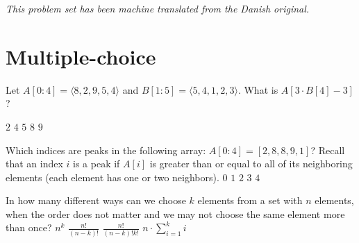 \noindent\emph{This problem set has been machine translated from the Danish original.}
\medskip

\section*{Multiple-choice}\label{sec:mc}


\multiplechoicestart



Let \(A[0:4] = \langle 8, 2, 9, 5, 4 \rangle\) and \(B[1:5] = \langle 5, 4, 1, 2, 3 \rangle\).
What is \(A[3 \cdot B[4]-3]\)?
\oneanswer

\optionsstart
\answer \(2\)
\answer \(4\)
\answer \(5\) \correct
\answer \(8\)
\answer \(9\)
\optionsend
{}

Which indices are peaks in the following array: \(A[0:4] = [2,8,8,9,1]\)?
Recall that an index \(i\) is a peak if \(A[i]\) is greater than or equal to all of its neighboring elements (each element has one or two neighbors).
\multipleanswers
\optionsstart
\answer \(0\)
\answer \(1\) \correct
\answer \(2\)
\answer \(3\) \correct
\answer \(4\)
\optionsend
{}

In how many different ways can we choose \(k\) elements from a set with
\(n\) elements, when the order does not matter and we may not choose the same element
more than once?
\oneanswer
\optionsstart
\answer \(n^{k}\)
\answer \(\frac{n!}{(n-k)!}\)
\answer \(\frac{n!}{(n-k)!k!}\) \correct
\answer \(n \cdot \sum_{i=1}^{k} i\)
\optionsend
{}


